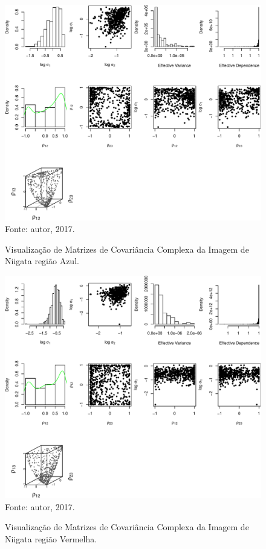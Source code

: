 \documentclass[journal]{IEEEtran}
\begin{document}
\begin{figure}[ht]
\centering
\caption{Visualização de Matrizes de Covariância Complexa da Imagem de Niigata região Azul.}
\includegraphics[width=\linewidth]{../../Figuras/Amostras-Niigata/Niigata-Azul-500.pdf}\\
Fonte: autor, 2017.
\label{visNiigata2}
\end{figure}

\newpage

\begin{figure}[ht]
\centering
\caption{Visualização de Matrizes de Covariância Complexa da Imagem de Niigata região Vermelha.}
\includegraphics[width=\linewidth]{../../Figuras/Amostras-Niigata/Niigata-Vermelha-500.pdf}\\
Fonte: autor, 2017.
\label{visNiigata3}
\end{figure}
\end{document}

